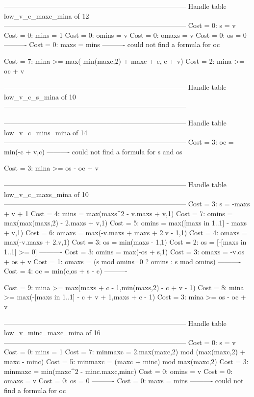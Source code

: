 --------------------------------------------------------------------------------
Handle table low_v_c_maxc_mina of 12
--------------------------------------------------------------------------------
Cost =  0:  s     = v
Cost =  0:  mins  = 1
Cost =  0:  omins = v
Cost =  0:  omaxs = v
Cost =  0:  os    = 0
----------
Cost =  0:  maxs  = mins
----------
could not find a formula for oc

Cost =  7:  mina >= max(-min(maxc,2) + maxc + c,-c + v)
Cost =  2:  mina >= -oc + v

--------------------------------------------------------------------------------
Handle table low_v_c_s_mina of 10
--------------------------------------------------------------------------------


--------------------------------------------------------------------------------
Handle table low_v_c_mins_mina of 14
--------------------------------------------------------------------------------
Cost =  3:  oc = min(-c + v,c)
----------
could not find a formula for s and os

Cost =  3:  mina >= os - oc + v

--------------------------------------------------------------------------------
Handle table low_v_c_maxs_mina of 10
--------------------------------------------------------------------------------
Cost =  3:  s     = -maxs + v + 1
Cost =  4:  mins  = max(maxs^2 - v.maxs + v,1)
Cost =  7:  omins = max(max(maxs,2) - 2.maxs + v,1)
Cost =  5:  omins = max([maxs in 1..1] - maxs + v,1)
Cost =  6:  omaxs = max(-v.maxs + maxs + 2.v - 1,1)
Cost =  4:  omaxs = max(-v.maxs + 2.v,1)
Cost =  3:  os    = min(maxs - 1,1)
Cost =  2:  os    = [-[maxs in 1..1] >= 0]
----------
Cost =  3:  omins = max(-os + s,1)
Cost =  3:  omaxs = -v.os + os + v
Cost =  1:  omaxs = (s mod omins=0 ? omins : s mod omins)
----------
Cost =  4:  oc    = min(c,os + s - c)
----------

Cost =  9:  mina >= max(maxs + c - 1,min(maxs,2) - c + v - 1)
Cost =  8:  mina >= max(-[maxs in 1..1] - c + v + 1,maxs + c - 1)
Cost =  3:  mina >= os - oc + v

--------------------------------------------------------------------------------
Handle table low_v_minc_maxc_mina of 16
--------------------------------------------------------------------------------
Cost =  0:  s       = v
Cost =  0:  mins    = 1
Cost =  7:  minmaxc = 2.max(maxc,2) mod (max(maxc,2) + maxc - minc)
Cost =  5:  minmaxc = (maxc + minc) mod max(maxc,2)
Cost =  3:  minmaxc = min(maxc^2 - minc.maxc,minc)
Cost =  0:  omins   = v
Cost =  0:  omaxs   = v
Cost =  0:  os      = 0
----------
Cost =  0:  maxs    = mins
----------
could not find a formula for oc

